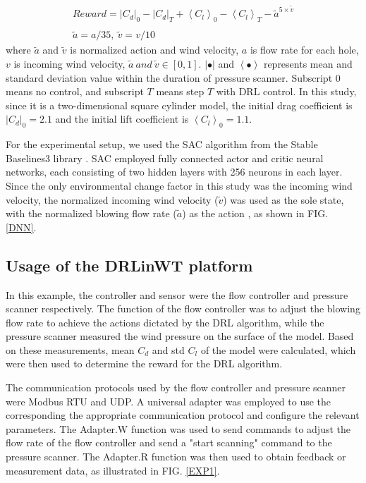 \documentclass[%
 aip,
 amsmath,amssymb,
 reprint,%
]{revtex4-1}
\begin{document}
\begin{equation}
\begin{array}{l}
{{Reward} =  {\left| {{C_d}} \right|_0} - {\left| {{C_d}} \right|_T} + {\left\langle {{C_l}} \right\rangle _0} - {\left\langle {{C_l}} \right\rangle _T} - {\tilde a^{5 \times \tilde v}}}\\
\\
\tilde a = a/35,\ \tilde v = v/10
\end{array}
\label{multiple:rewardfunction}
\end{equation}
where $\tilde a$ and $\tilde v$  is normalized action and wind velocity, $a$ is flow rate for each hole, $v$ is incoming wind velocity, $\tilde a \  and \  \tilde v \in [0,1]$. $\left| \bullet \right|$ and $\left\langle \bullet \right\rangle $ represents mean and standard deviation value within the duration of pressure scanner. Subscript $0$ means no control, and subscript $T$ means step $T$ with DRL control. In this study, since it is a two-dimensional square cylinder model, the initial drag coefficient is ${\left| {{C_d}} \right|_0} = 2.1$ and the initial lift coefficient is ${\left\langle {{C_l}} \right\rangle _0} = 1.1$.

For the experimental setup, we used the SAC algorithm from the Stable Baselines3 library \cite{stable-baselines3}. SAC employed fully connected actor and critic neural networks, each consisting of two hidden layers with 256 neurons in each layer. Since the only environmental change factor in this study was the incoming wind velocity, the normalized incoming wind velocity ($\tilde{v}$) was used as the sole state, with the normalized blowing flow rate ($\tilde{a}$) as the action , as shown in FIG. \ref{DNN}.


\subsection{Usage of the DRLinWT platform}

In this example, the controller and sensor were the flow controller and pressure scanner respectively. The function of the flow controller was to adjust the blowing flow rate to achieve the actions dictated by the DRL algorithm, while the pressure scanner measured the wind pressure on the surface of the model. Based on these measurements, mean $C_d$  and std $C_l$ of the model were calculated, which were then used to determine the reward for the DRL algorithm.

The communication protocols used by the flow controller and pressure scanner were Modbus RTU and UDP. A universal adapter was employed to use the corresponding the appropriate communication protocol and configure the relevant parameters. The Adapter.W function was used to send commands to adjust the flow rate of the flow controller and send a "start scanning" command to the pressure scanner. The Adapter.R function was then used to obtain feedback or measurement data, as illustrated in FIG. \ref{EXP1}.
\end{document}
